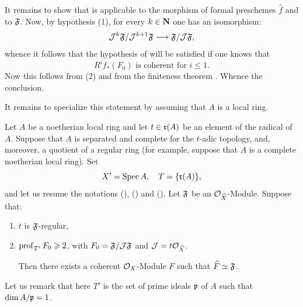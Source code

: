 It remains to show that  is applicable to the morphism of formal preschemes $\hat{f}$ and to $\mathfrak{F}$. Now, by hypothesis (1), for every $k\in \mathbf{N}$ one has an isomorphism:
\begin{equation*} {\Jb}^k \formelF /{\Jb}^{k+1}\formelF \to \formelF / {\Jb} \formelF,
\end{equation*}
whence it follows that the hypothesis of  will be satisfied if one knows that
\[
R^if_*(F_0)\text{ is coherent for }i \leq 1.
\]
Now this follows from (2) and from the finiteness theorem . Whence the conclusion.

It remains to specialize this statement by assuming that $A$ is a local ring.

\begin{corollary}\setcounter{equation}{8} \label{IX.2.3}
Let $A$ be a noetherian local ring and let $t \in \mathfrak{r}(A)$ be an element of the radical of $A$. Suppose that $A$ is separated and complete for the $t$-adic topology, and, moreover, a quotient of a regular ring (for example, suppose that $A$ is a complete noetherian local ring). Set
\begin{equation} \label{eq:IX.2.9} X'=\operatorname{Spec} A, \quad T = \{ \mathfrak{r}(A) \},
\end{equation}
and let us resume the notations (), () and (). Let $\mathfrak{F}$ be an ${\mathcal O}_{\widehat{X}}$-Module. Suppose that:
\begin{enumerate}
\item
$t$ is $\mathfrak{F}$-regular,
\item
$\operatorname{prof}_{T'} F_0 \geqslant 2$, with $F_0=\mathfrak{F}/{\mathcal{J}}\mathfrak{F}$ and ${\mathcal{J}}=t{\mathcal O}_{\widehat{X}}$.

Then there exists a coherent $\mathcal{O}_X$-Module $F$ such that $\widehat{F}\simeq \mathfrak{F}$.
\end{enumerate}
\end{corollary}

Let us remark that here $T'$ is the set of prime ideals $\mathfrak{p}$ of $A$ such that \hbox{$\dim A/\mathfrak{p} =1$}.
